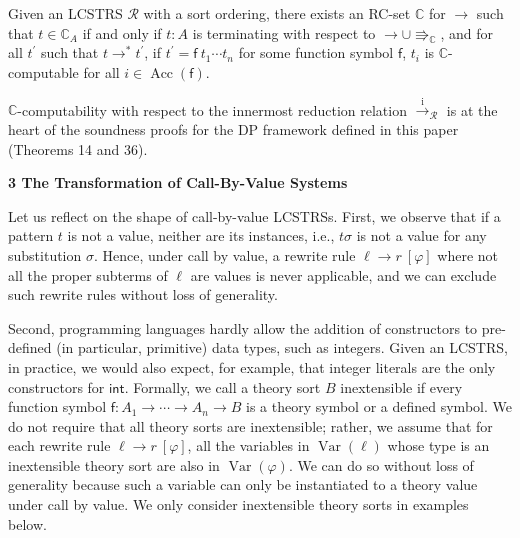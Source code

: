 Given an LCSTRS $\mathcal{R}$ with a sort ordering, there exists an RC-set $\mathbb{C}$ for $\rightarrow$ such that $t\in\mathbb{C}_{A}$ if and only if $t:A$ is terminating with respect to ${\rightarrow}\cup{\Rrightarrow_{\mathbb{C}}}$, and for all $t^{\prime}$ such that $t\rightarrow^{*}t^{\prime}$, if $t^{\prime}={\mathsf{f}}\ {{t}_{1}\cdots{t}_{n}}$ for some function symbol $\mathsf{f}$, $t_{i}$ is $\mathbb{C}$-computable for all $i\in\operatorname{Acc}(\mathsf{f})$.\par
 
 
 
 
$\mathbb{C}$-computability with respect to the innermost reduction relation $\xrightarrow{\scriptscriptstyle\mathrm{i}}_{\mathcal{R}}$ is at the heart of the soundness proofs for the DP framework defined in this paper (Theorems 14 and 36).\par
 
 
 
 


 
\par\medskip\noindent\textbf{3 The Transformation of Call-By-Value Systems}\par
 
 
Let us reflect on the shape of call-by-value LCSTRSs. First, we observe that if a pattern $t$ is not a value, neither are its instances, i.e., $t\sigma$ is not a value for any substitution $\sigma$. Hence, under call by value, a rewrite rule ${\ell}\rightarrow{r}\ [\varphi]$ where not all the proper subterms of $\ell$ are values is never applicable, and we can exclude such rewrite rules without loss of generality.\par
 
 
 
Second, programming languages hardly allow the addition of constructors to pre-defined (in particular, primitive) data types, such as integers. Given an LCSTRS, in practice, we would also expect, for example, that integer literals are the only constructors for $\mathsf{int}$. Formally, we call a theory sort $B$ inextensible if every function symbol $\mathsf{f}:{A}_{1}\rightarrow\cdots\rightarrow{A}_{n}\rightarrow B$ is a theory symbol or a defined symbol. We do not require that all theory sorts are inextensible; rather, we assume that for each rewrite rule ${\ell}\rightarrow{r}\ [\varphi]$, all the variables in $\operatorname{Var}(\ell)$ whose type is an inextensible theory sort are also in $\operatorname{Var}(\varphi)$. We can do so without loss of generality because such a variable can only be instantiated to a theory value under call by value. We only consider inextensible theory sorts in examples below.\par
 
